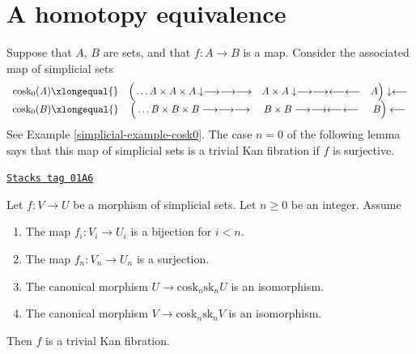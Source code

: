 \section{A homotopy equivalence}
\label{simplicial-section-homotopy-equivalence}
Suppose that $A$, $B$ are sets, and that $f : A \to B$
is a map. Consider the associated map of
simplicial sets
$$
\begin{array}{cccc}\text{cosk}_0(A) \xlongequal{} & \Big(\ldots A \times A \times A
\downarrow\longrightarrow\longrightarrow\longrightarrow & A \times A \downarrow\longrightarrow\longrightarrow\longleftarrow\longleftarrow & A \Big) \downarrow\longleftarrow \\ \text{cosk}_0(B) \xlongequal{} & \Big( \ldots B \times B \times B \longrightarrow\longrightarrow\longrightarrow & B \times B \longrightarrow\longrightarrow\longleftarrow\longleftarrow & B \Big) \longleftarrow\end{array}
$$
See Example \ref{simplicial-example-cosk0}. The case $n = 0$ of the following lemma
says that this map of simplicial sets is a trivial Kan fibration if $f$ is
surjective.

\begin{lemma}[Section]
\label{simplicial-lemma-section}
\href{https://stacks.math.columbia.edu/tag/01A6}{\texttt{Stacks tag 01A6}}

Let $f : V \to U$ be a morphism of simplicial sets. Let $n \geq 0$ be an
integer. Assume
\begin{enumerate}
\item The map $f_i : V_i \to U_i$ is a bijection for $i < n$.
\item The map $f_n : V_n \to U_n$ is a surjection.
\item The canonical morphism $U \to \text{cosk}_n \text{sk}_n U$
is an isomorphism.
\item The canonical morphism $V \to \text{cosk}_n \text{sk}_n V$
is an isomorphism.
\end{enumerate}
Then $f$ is a trivial Kan fibration.
\end{lemma}


